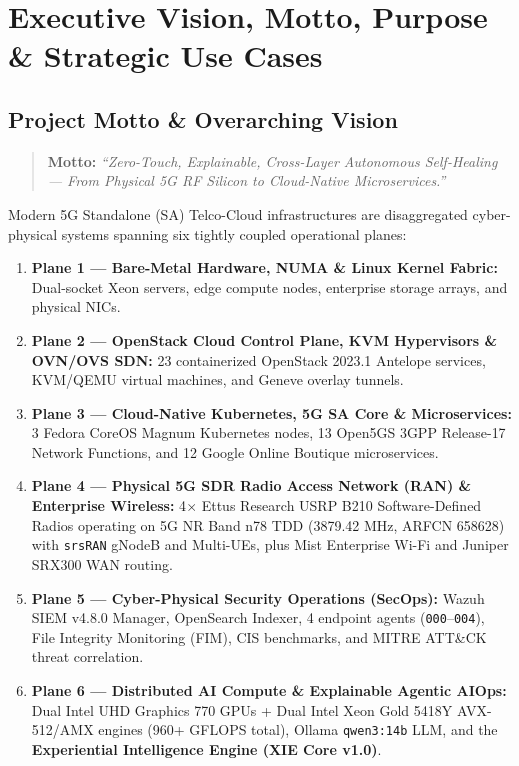 \documentclass[11pt,a4paper]{article}
\begin{document}
\tableofcontents
\newpage

\section{Executive Vision, Motto, Purpose \& Strategic Use Cases}

\subsection{Project Motto \& Overarching Vision}
\begin{quote}
\textbf{Motto:} \textit{``Zero-Touch, Explainable, Cross-Layer Autonomous Self-Healing --- From Physical 5G RF Silicon to Cloud-Native Microservices.''}
\end{quote}

Modern 5G Standalone (SA) Telco-Cloud infrastructures are disaggregated cyber-physical systems spanning six tightly coupled operational planes:
\begin{enumerate}
    \item \textbf{Plane 1 --- Bare-Metal Hardware, NUMA \& Linux Kernel Fabric:} Dual-socket Xeon servers, edge compute nodes, enterprise storage arrays, and physical NICs.
    \item \textbf{Plane 2 --- OpenStack Cloud Control Plane, KVM Hypervisors \& OVN/OVS SDN:} 23 containerized OpenStack 2023.1 Antelope services, KVM/QEMU virtual machines, and Geneve overlay tunnels.
    \item \textbf{Plane 3 --- Cloud-Native Kubernetes, 5G SA Core \& Microservices:} 3 Fedora CoreOS Magnum Kubernetes nodes, 13 Open5GS 3GPP Release-17 Network Functions, and 12 Google Online Boutique microservices.
    \item \textbf{Plane 4 --- Physical 5G SDR Radio Access Network (RAN) \& Enterprise Wireless:} 4$\times$ Ettus Research USRP B210 Software-Defined Radios operating on 5G NR Band n78 TDD (3879.42 MHz, ARFCN 658628) with \texttt{srsRAN} gNodeB and Multi-UEs, plus Mist Enterprise Wi-Fi and Juniper SRX300 WAN routing.
    \item \textbf{Plane 5 --- Cyber-Physical Security Operations (SecOps):} Wazuh SIEM v4.8.0 Manager, OpenSearch Indexer, 4 endpoint agents (\texttt{000}--\texttt{004}), File Integrity Monitoring (FIM), CIS benchmarks, and MITRE ATT\&CK threat correlation.
    \item \textbf{Plane 6 --- Distributed AI Compute \& Explainable Agentic AIOps:} Dual Intel UHD Graphics 770 GPUs + Dual Intel Xeon Gold 5418Y AVX-512/AMX engines (960+ GFLOPS total), Ollama \texttt{qwen3:14b} LLM, and the \textbf{Experiential Intelligence Engine (XIE Core v1.0)}.
\end{enumerate}
\end{document}

